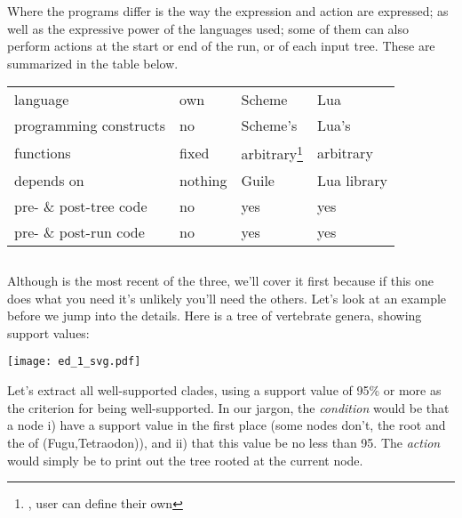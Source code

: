 Where the programs differ is the way the expression and action are expressed; as
well as the expressive power of the languages used; some of them can also
perform actions at the start or end of the run, or of each input tree. These are
summarized in the table below.

\begin{center}
	\begin{minipage}{0.8\textwidth}
		\renewcommand{\thefootnote}{\thempfootnote}
		\begin{tabular}{llll}
		& \ed & \sched & \luaed \\
		\hline
		language & own & Scheme & Lua \\
		programming constructs & no & Scheme's & Lua's \\
		functions & fixed & arbitrary\footnote{\ie, user can define their own} &
		arbitrary\footnotemark[\value{mpfootnote}] \\
		depends on & nothing & \gnu{} Guile & Lua library \\
		pre- \& post-tree code & no & yes & yes \\
		pre- \& post-run code & no & yes & yes
		\end{tabular}
	\end{minipage}
\end{center}

\subsection{\luaed}
\label{sct:luaed}

Although \luaed{} is the most recent of the three, we'll cover it first because
if this one does what you need it's unlikely you'll need the others.  Let's look
at an example before we jump into the details. Here is a tree of vertebrate
genera, showing support values:


\begin{center}
\texttt{[image: ed\_1\_svg.pdf]}
\end{center}

\noindent{}Let's extract all well-supported clades, using a support value of
95\% or more as the criterion for being well-supported. In our jargon, the
\emph{condition} would be that a node i) have a support value in the first place
(some nodes don't, \eg{} the root and the \lca{} of (Fugu,Tetraodon)), and ii)
that this value be no less than 95. The \emph{action} would simply be to print
out the tree rooted at the current node.

